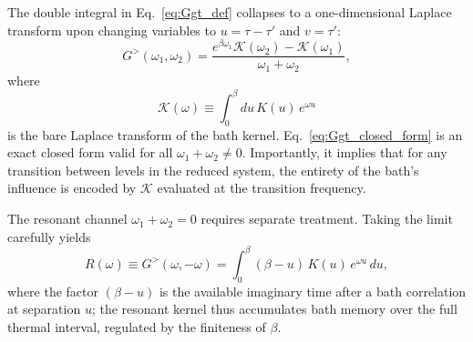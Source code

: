 The double integral in Eq.~\eqref{eq:Ggt_def} collapses to a one-dimensional Laplace transform
upon changing variables to $u=\tau-\tau'$ and $v=\tau'$:
\begin{equation}
    G^{>}(\omega_1,\omega_2)
    = \frac{e^{\beta\omega_1}\mathcal{K}(\omega_2)-\mathcal{K}(\omega_1)}{\omega_1+\omega_2},
    \label{eq:Ggt_closed_form}
\end{equation}
where
\begin{equation}
    \mathcal{K}(\omega)\equiv\int_0^\beta du\,K(u)\,e^{\omega u}
    \label{eq:K_laplace}
\end{equation}
is the bare Laplace transform of the bath kernel. Eq.~\eqref{eq:Ggt_closed_form} is an exact
closed form valid for all $\omega_1+\omega_2\neq 0$. Importantly, it implies that for any transition between levels in the reduced system, the entirety of the bath's influence is encoded by $\mathcal{K}$ evaluated at the transition frequency.

The resonant channel $\omega_1+\omega_2=0$ requires separate treatment. Taking the limit carefully
yields
\begin{equation}
    R(\omega)\equiv G^{>}(\omega,-\omega)
    = \int_0^\beta\!(\beta-u)\,K(u)\,e^{\omega u}\,du,
    \label{eq:R_resonant}
\end{equation}
where the factor $(\beta-u)$ is the available imaginary time after a bath correlation at
separation $u$; the resonant kernel thus accumulates bath memory over the full thermal interval,
regulated by the finiteness of $\beta$.






